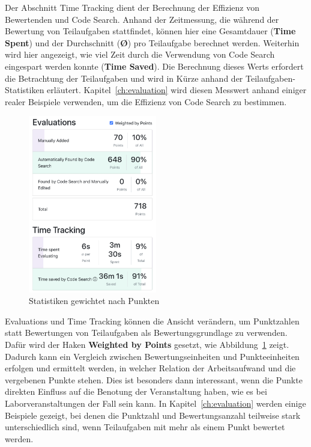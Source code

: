 Der Abschnitt Time Tracking dient der Berechnung der Effizienz von Bewertenden und Code Search.
Anhand der Zeitmessung, die während der Bewertung von Teilaufgaben stattfindet, können hier eine Gesamtdauer (\textbf{Time Spent}) und der Durchschnitt (\textbf{\O}) pro Teilaufgabe berechnet werden.
Weiterhin wird hier angezeigt, wie viel Zeit durch die Verwendung von Code Search eingespart werden konnte (\textbf{Time Saved}).
Die Berechnung dieses Werts erfordert die Betrachtung der Teilaufgaben und wird in Kürze anhand der Teilaufgaben-Statistiken erläutert.
Kapitel~\ref{ch:evaluation} wird diesen Messwert anhand einiger realer Beispiele verwenden, um die Effizienz von Code Search zu bestimmen.

\begin{figure}
    \centering
    \includegraphics[width=0.5\textwidth]{images/assignment-statistics-by-points}
    \caption{Statistiken gewichtet nach Punkten}
    \label{fig:assignment-statistics-by-points}
\end{figure}

Evaluations und Time Tracking können die Ansicht verändern, um Punktzahlen statt Bewertungen von Teilaufgaben als Bewertungsgrundlage zu verwenden.
Dafür wird der Haken \textbf{Weighted by Points} gesetzt, wie Abbildung~\ref{fig:assignment-statistics-by-points} zeigt.
Dadurch kann ein Vergleich zwischen Bewertungseinheiten und Punkteeinheiten erfolgen und ermittelt werden, in welcher Relation der Arbeitsaufwand und die vergebenen Punkte stehen.
Dies ist besonders dann interessant, wenn die Punkte direkten Einfluss auf die Benotung der Veranstaltung haben, wie es bei Laborveranstaltungen der Fall sein kann.
In Kapitel~\ref{ch:evaluation} werden einige Beispiele gezeigt, bei denen die Punktzahl und Bewertungsanzahl teilweise stark unterschiedlich sind, wenn Teilaufgaben mit mehr als einem Punkt bewertet werden.

